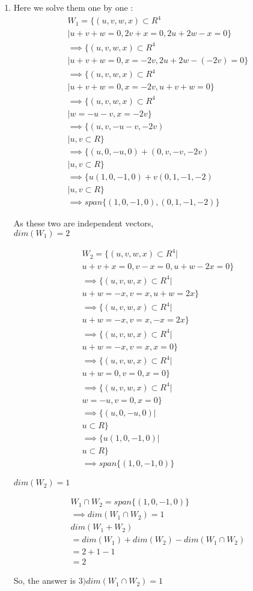 \begin{enumerate}
    \item Here we solve them one by one :
\begin{multline}
    W_{1}=\{(u,v,w,x)\subset R^{4} \\ | u+v+w=0,2v+x=0,2u+2w-x=0\}
\\
    \implies \{(u,v,w,x)\subset R^{4} \\ | u+v+w=0,x=-2v,2u+2w-(-2v)=0\}
\\
    \implies \{(u,v,w,x)\subset R^{4} \\ | u+v+w=0,x=-2v,u+v+w=0\}
\\
    \implies \{(u,v,w,x)\subset R^{4} \\ | w=-u-v,x=-2v\}
\\
    \implies \{(u,v,-u-v,-2v) \\ | u,v \subset R\}
\\
    \implies \{(u,0,-u,0)+(0,v,-v,-2v) \\ | u,v \subset R\}
\\
    \implies \{u(1,0,-1,0)+v(0,1,-1,-2) \\ | u,v \subset R\}
\\
    \implies span\{(1,0,-1,0),(0,1,-1,-2)\}
\end{multline}

As these two are independent vectors,\\ 
$dim(W_{1})=2$

\begin{multline}
    W_{2}=\{(u,v,w,x)\subset R^{4} | \\ u+v+x=0,v-x=0,u+w-2x=0\}
\\
    \implies \{(u,v,w,x)\subset R^{4} | \\ u+w=-x,v=x,u+w=2x\}
\\
    \implies \{(u,v,w,x)\subset R^{4} | \\ u+w=-x,v=x,-x=2x\}
\\
    \implies \{(u,v,w,x)\subset R^{4} | \\ u+w=-x,v=x,x=0\}
\\
   \implies \{(u,v,w,x)\subset R^{4} | \\ u+w=0,v=0,x=0\}
\\
   \implies \{(u,v,w,x)\subset R^{4} | \\ w=-u,v=0,x=0\}
\\
    \implies \{(u,0,-u,0) | \\ u \subset R\}
\\
    \implies \{u(1,0,-1,0) | \\ u \subset R\}
\\
    \implies span\{(1,0,-1,0)\}
\end{multline}

$dim(W_{2})=1$

\begin{multline}
    W_{1} \cap W_{2} = span\{(1,0,-1,0)\}
\\
    \implies dim(W_{1} \cap W_{2})=1
\\
    dim(W_{1}+W_{2}) \\ =dim(W_{1})+dim(W_{2})-dim(W_{1} \cap W_{2})
\\
    =2+1-1
\\
    =2
\end{multline}

So, the answer is $3) dim(W_{1}\cap W_{2})=1$
\end{enumerate}




